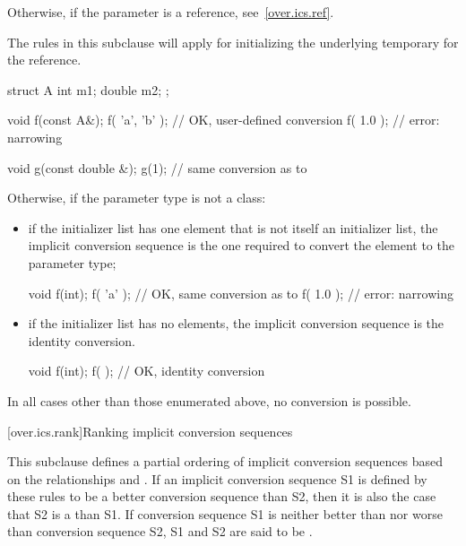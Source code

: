 \pnum
Otherwise, if the parameter is a reference, see~\ref{over.ics.ref}.
\begin{note}
The rules in this subclause will apply for initializing the underlying temporary
for the reference.
\end{note}
\begin{example}
\begin{codeblock}
struct A {
  int m1;
  double m2;
};

void f(const A&);
f( {'a', 'b'} );        // OK,  user-defined conversion
f( {1.0} );             // error: narrowing

void g(const double &);
g({1});                 // same conversion as  to 
\end{codeblock}
\end{example}

\pnum
Otherwise, if the parameter type is not a class:
\begin{itemize}
\item if the initializer list has one element that is not itself an initializer list,
the implicit conversion sequence is the one required to convert the element to
the parameter type;
\begin{example}
\begin{codeblock}
void f(int);
f( {'a'} );             // OK, same conversion as  to 
f( {1.0} );             // error: narrowing
\end{codeblock}
\end{example}

\item if the initializer list has no elements, the implicit conversion sequence
is the identity conversion.
\begin{example}
\begin{codeblock}
void f(int);
f( { } );               // OK, identity conversion
\end{codeblock}
\end{example}
\end{itemize}

\pnum
In all cases other than those enumerated above, no conversion is possible.

[over.ics.rank]{Ranking implicit conversion sequences}

\pnum
This subclause defines a partial ordering of implicit conversion
sequences based on the relationships
and
.
If an implicit conversion sequence S1 is
defined by these rules to be a better conversion sequence than
S2, then it is also the case that S2 is a
than S1.
If conversion sequence S1 is neither better
than nor worse than conversion sequence S2, S1 and S2 are said to
be
.

